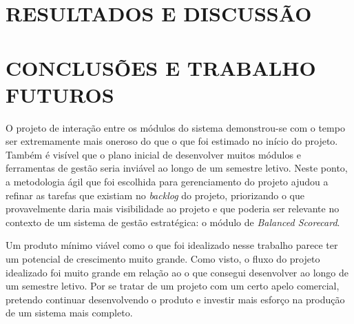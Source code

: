 \documentclass{abnt}
\begin{document}
\chapter{RESULTADOS E DISCUSSÃO}


\chapter{CONCLUSÕES E TRABALHO FUTUROS}

O projeto de interação entre os módulos do sistema demonstrou-se com o tempo ser
extremamente mais oneroso do que o que foi estimado no início do projeto. Também
é visível que o plano inicial de desenvolver muitos módulos e ferramentas de
gestão seria inviável ao longo de um semestre letivo. Neste ponto, a metodologia
ágil que foi escolhida para gerenciamento do projeto ajudou a refinar as tarefas
que existiam no \textit{backlog} do projeto, priorizando o que provavelmente
daria mais visibilidade ao projeto e que poderia ser relevante no contexto de um
sistema de gestão estratégica: o módulo de \textit{Balanced Scorecard}.


Um produto mínimo viável como o que foi idealizado nesse trabalho parece ter um
potencial de crescimento muito grande. Como visto, o fluxo do projeto idealizado
foi muito grande em relação ao o que consegui desenvolver ao longo de um
semestre letivo. Por se tratar de um projeto com um certo apelo comercial,
pretendo continuar desenvolvendo o produto e investir mais esforço na produção
de um sistema mais completo.



\end{document}
